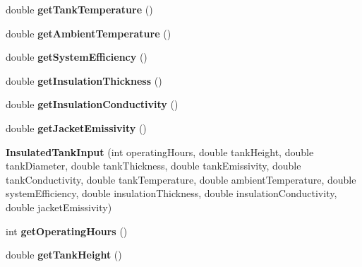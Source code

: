 \begin{DoxyCompactItemize}
\mbox{\label{class_insulated_tank_input_a79db35933549eefef6daa5ee9d9e6711}} 
double {\bfseries get\+Tank\+Temperature} ()
\item 
\mbox{\label{class_insulated_tank_input_ad132de18e6b3fa396d449bb2c37dd527}} 
double {\bfseries get\+Ambient\+Temperature} ()
\item 
\mbox{\label{class_insulated_tank_input_a5d072c8368862146fa4b1e96e9e656ef}} 
double {\bfseries get\+System\+Efficiency} ()
\item 
\mbox{\label{class_insulated_tank_input_a0390113c09b7a97d07ced6169fe7b7be}} 
double {\bfseries get\+Insulation\+Thickness} ()
\item 
\mbox{\label{class_insulated_tank_input_a53602b88819bff3e860d1fe3e1181995}} 
double {\bfseries get\+Insulation\+Conductivity} ()
\item 
\mbox{\label{class_insulated_tank_input_af3467e96bcf20c41f2d5fb02ad88aff9}} 
double {\bfseries get\+Jacket\+Emissivity} ()
\item 
\mbox{\label{class_insulated_tank_input_a0c907f9c88a2cc9151857fb42405df14}} 
{\bfseries Insulated\+Tank\+Input} (int operating\+Hours, double tank\+Height, double tank\+Diameter, double tank\+Thickness, double tank\+Emissivity, double tank\+Conductivity, double tank\+Temperature, double ambient\+Temperature, double system\+Efficiency, double insulation\+Thickness, double insulation\+Conductivity, double jacket\+Emissivity)
\item 
\mbox{\label{class_insulated_tank_input_acfba48cfbe1cb351746f37f143a8365b}} 
int {\bfseries get\+Operating\+Hours} ()
\item 
\mbox{\label{class_insulated_tank_input_a9a64c3eeae6f4b4c4c992dc11aaa28c6}} 
double {\bfseries get\+Tank\+Height} ()
\item 
\mbox{\label{class_insulated_tank_input_ad3b150db027aae91d37aff5450ff982a}} 

\end{DoxyCompactItemize}
